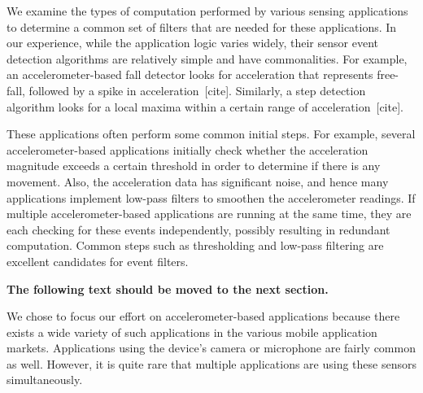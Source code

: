We examine the types of computation performed by various sensing applications to
determine a common set of filters that are needed for these applications. In our
experience, while the application logic varies widely, their sensor event
detection algorithms are relatively simple and have commonalities. For example,
an accelerometer-based fall detector looks for acceleration that represents
free-fall, followed by a spike in acceleration~[cite]. Similarly, a step
detection algorithm looks for a local maxima within a certain range of
acceleration~[cite]. 

These applications often perform some common initial steps. For example, several
accelerometer-based applications initially check whether the acceleration
magnitude exceeds a certain threshold in order to determine if there is any
movement. Also, the acceleration data has significant noise, and hence many
applications implement low-pass filters to smoothen the accelerometer readings.
If multiple accelerometer-based applications are running at the same time, they
are each checking for these events independently, possibly resulting in
redundant computation. Common steps such as thresholding and low-pass filtering
are excellent candidates for event filters.

\textbf{The following text should be moved to the next section.}

We chose to focus our effort on accelerometer-based applications because there
exists a wide variety of such applications in the various mobile application
markets. Applications using the device's camera or microphone are fairly common
as well. However, it is quite rare that multiple applications are using these
sensors simultaneously.
